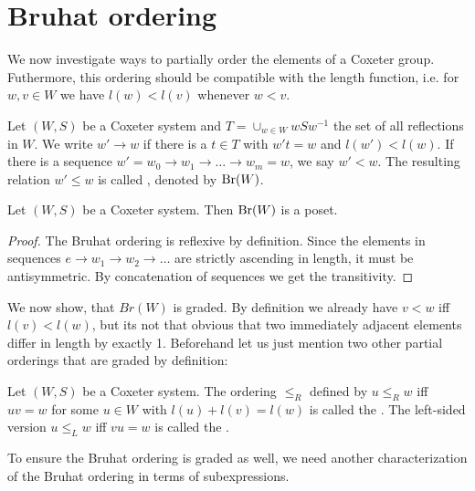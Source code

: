 \section{Bruhat ordering}
\label{sec:coxeter-groups-bruhat-ordering}

We now investigate ways to partially order the elements of a Coxeter group. Futhermore, this ordering should be compatible with the length function, i.e. for $w,v \in W$ we have $l(w) < l(v)$ whenever $w < v$.

\begin{defi}
	Let $(W,S)$ be a Coxeter system and $T = \cup_{w \in W} wSw^{-1}$ the set of all reflections in $W$. We write $w' \to w$ if there is a $t \in T$ with $w't = w$ and $l(w') < l(w)$. If there is a sequence $w' = w_0 \to w_1 \to \ldots \to w_m = w$, we say $w' < w$. The resulting relation $w' \leq w$ is called , denoted by $\operatorname{Br}(W)$.
\end{defi}

\begin{lemm}
	Let $(W,S)$ be a Coxeter system. Then $\operatorname{Br}(W)$ is a poset.

	\begin{proof}
		The Bruhat ordering is reflexive by definition. Since the elements in sequences $e \to w_1 \to w_2 \to \ldots$ are strictly ascending in length, it must be antisymmetric. By concatenation of sequences we get the transitivity.
	\end{proof}
\end{lemm}

We now show, that $Br(W)$ is graded. By definition we already have $v < w$ iff $l(v) < l(w)$, but its not that obvious that two immediately adjacent elements differ in length by exactly 1. Beforehand let us just mention two other partial orderings that are graded by definition:

\begin{defi}
	Let $(W,S)$ be a Coxeter system. The ordering $\leq_R$ defined by $u \leq_R w$ iff $uv = w$ for some $u \in W$ with $l(u) + l(v) = l(w)$ is called the . The left-sided version $u \leq_L w$ iff $vu = w$ is called the .
\end{defi}

To ensure the Bruhat ordering is graded as well, we need another characterization of the Bruhat ordering in terms of subexpressions.

